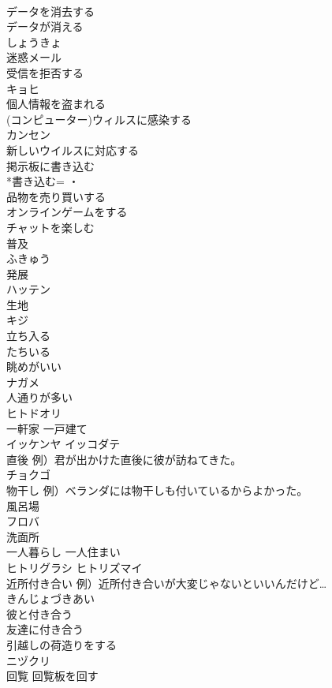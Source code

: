 \documentclass[8pt]{extreport}
\begin{document}
\begin{CJK}{UTF8}{min}
\\	データを消去する 
\\	データが消える	
\\	しょうきょ
\\	迷惑メール	
\\	受信を拒否する	
\\	キョヒ
\\	個人情報を盗まれる	
\\	(コンピューター)ウィルスに感染する	
\\	カンセン
\\	新しいウイルスに対応する	
\\	掲示板に書き込む	
\\	*書き込む= ・
\\	品物を売り買いする	
\\	オンラインゲームをする	
\\	チャットを楽しむ	
\\	普及	
\\	ふきゅう
\\	発展	
\\	ハッテン
\\	生地	
\\	キジ
\\	立ち入る	
\\	たちいる
\\	眺めがいい	
\\	ナガメ
\\	人通りが多い	
\\	ヒトドオリ
\\	一軒家 一戸建て	
\\	イッケンヤ イッコダテ
\\	直後 例）君が出かけた直後に彼が訪ねてきた。	
\\	チョクゴ
\\	物干し 例）ベランダには物干しも付いているからよかった。	
\\	風呂場	
\\	フロバ
\\	洗面所	
\\	一人暮らし 一人住まい	
\\	ヒトリグラシ ヒトリズマイ
\\	近所付き合い 例）近所付き合いが大変じゃないといいんだけど…	
\\	きんじょづきあい
\\	彼と付き合う	
\\	友達に付き合う	
\\	引越しの荷造りをする	
\\	ニヅクリ
\\	回覧 回覧板を回す	

\end{CJK}
\end{document}
